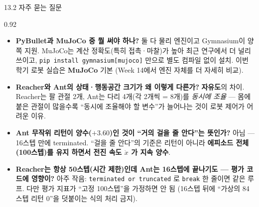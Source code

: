 \begin{frame}{13.2 자주 묻는 질문}
\begin{center}\begin{varwidth}{0.92\textwidth}
  \small
  \begin{itemize}
    \item \textbf{PyBullet과 MuJoCo 중 뭘 써야 하나?} 둘 다 물리 엔진이고
      Gymnasium이 양쪽 지원. MuJoCo는 계산 정확도(특히 접촉·마찰)가 높아
      최근 연구에서 더 널리 쓰이고, \texttt{pip install gymnasium[mujoco]}
      만으로 별도 컴파일 없이 설치. 이번 학기 로봇 실습은 \textbf{MuJoCo}
      기본 (Week 14에서 엔진 자체를 더 자세히 비교).
    \item \textbf{Reacher와 Ant의 상태·행동공간 크기가 왜 이렇게 다른가?}
      \textbf{자유도}의 차이. Reacher는 팔 관절 2개, Ant는 다리 4개(각 2개씩
      = 8개)를 \emph{동시에 조율} --- 몸에 붙은 관절이 많을수록 ``동시에
      조율해야 할 변수''가 늘어나는 것이 로봇 제어가 어려운 이유.
    \item \textbf{Ant 무작위 리턴이 양수($+3.60$)인 것이 ``거의 걸을 줄
      안다''는 뜻인가?} 아님 --- 16스텝 만에 terminated. ``걸을 줄
      안다''의 기준은 리턴이 아니라 \textbf{에피소드 전체(100스텝)를 유지
      하면서 전진 속도 $\dot{x}$ 가 지속 양수}.
    \item \textbf{Reacher는 항상 50스텝(시간 제한)인데 Ant는 16스텝에
      끝나기도 --- 평가 코드에 영향이?} 아주 작음: \texttt{terminated or
      truncated} 로 \texttt{break} 한 줄이면 같은 루프. 다만 평가 지표가
      ``고정 100스텝''을 가정하면 안 됨 (16스텝 뒤에 ``가상의 84스텝
      리턴 0''을 덧붙이는 식의 처리 금지).
  \end{itemize}
\end{varwidth}\end{center}
\end{frame}
